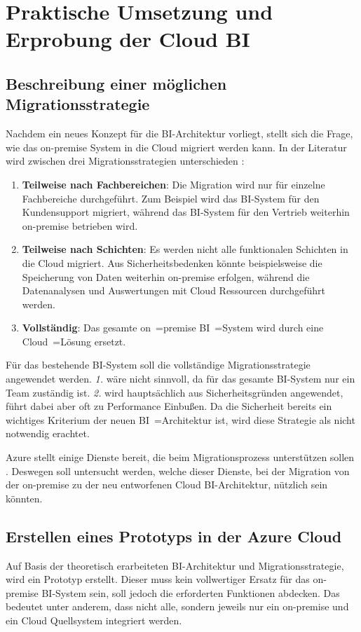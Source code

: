 \chapter{Praktische Umsetzung und Erprobung der Cloud BI} \label{ch:praktischeUmsetzung}

\section{Beschreibung einer möglichen Migrationsstrategie}
\label{sec:beschreibungMigrationsstrategie}
Nachdem ein neues Konzept für die BI-Architektur vorliegt, stellt sich die Frage, wie das on-premise System in die Cloud migriert werden kann. In der Literatur wird zwischen drei Migrationsstrategien unterschieden \cite{juan-verdejo_moving_2014}:
\begin{enumerate}
\item \textbf{Teilweise nach Fachbereichen}: Die Migration wird nur für einzelne Fachbereiche durchgeführt. Zum Beispiel wird das BI-System für den Kundensupport migriert, während das BI-System für den Vertrieb weiterhin on-premise betrieben wird.
\item \textbf{Teilweise nach Schichten}: Es werden nicht alle funktionalen Schichten in die Cloud migriert. Aus Sicherheitsbedenken könnte beispielsweise die Speicherung von Daten weiterhin on-premise erfolgen, während die Datenanalysen und Auswertungen mit Cloud Ressourcen durchgeführt werden.
\item \textbf{Vollständig}: Das gesamte on~=premise BI~=System wird durch eine Cloud~=Lösung ersetzt.
\end{enumerate}
Für das bestehende BI-System soll die vollständige Migrationsstrategie angewendet werden. \textit{1.} wäre nicht sinnvoll, da für das gesamte BI-System nur ein Team zuständig ist. \textit{2.} wird hauptsächlich aus Sicherheitsgründen angewendet, führt dabei aber oft zu Performance Einbußen. Da die Sicherheit bereits ein wichtiges Kriterium der neuen BI~=Architektur ist, wird diese Strategie als nicht notwendig erachtet.

Azure stellt einige Dienste bereit, die beim Migrationsprozess unterstützen sollen \cite{chilberto_building_2020}. Deswegen soll untersucht werden, welche dieser Dienste, bei der Migration von der on-premise zu der neu entworfenen Cloud BI-Architektur, nützlich sein könnten.

\section{Erstellen eines Prototyps in der Azure Cloud}
\label{sec:intro:erstellenDesPrototyps}
Auf Basis der theoretisch erarbeiteten BI-Architektur und Migrationsstrategie, wird ein Prototyp erstellt. Dieser muss kein vollwertiger Ersatz für das on-premise BI-System sein, soll jedoch die erforderten Funktionen abdecken. Das bedeutet unter anderem, dass nicht alle, sondern jeweils nur ein on-premise und ein Cloud Quellsystem integriert werden.

